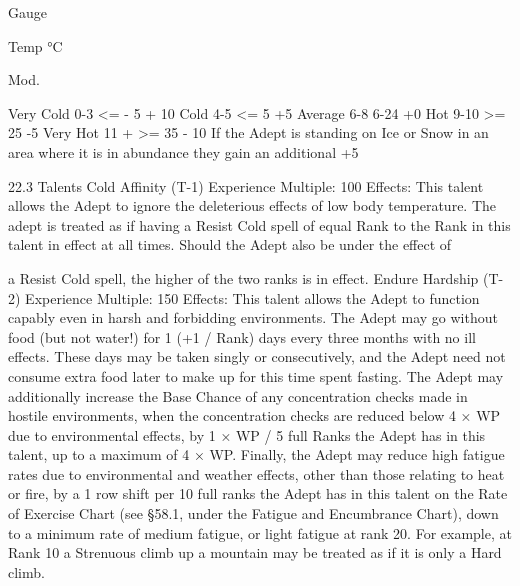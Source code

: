 \documentclass[a4paper]{article}
\begin{document}
\begin{multicols}{3}
Gauge

Temp °C

Mod.

Very Cold 0-3
<= - 5
+ 10
Cold
4-5
<= 5
+5
Average
6-8
6-24
+0
Hot
9-10
>= 25
-5
Very Hot
11 +
>= 35
- 10
If the Adept is standing on Ice or Snow in an area
where it is in abundance they gain an additional
+5%

22.3 Talents
Cold Affinity (T-1)
Experience Multiple: 100
Effects: This talent allows the Adept to ignore the
deleterious effects of low body temperature. The
adept is treated as if having a Resist Cold spell of
equal Rank to the Rank in this talent in effect at all
times. Should the Adept also be under the effect of

a Resist Cold spell, the higher of the two ranks is in
effect.
Endure Hardship (T-2)
Experience Multiple: 150
Effects: This talent allows the Adept to function
capably even in harsh and forbidding environments. The Adept may go without food (but not
water!) for 1 (+1 / Rank) days every three months
with no ill effects. These days may be taken singly
or consecutively, and the Adept need not consume
extra food later to make up for this time spent
fasting. The Adept may additionally increase the
Base Chance of any concentration checks made in
hostile environments, when the concentration
checks are reduced below 4 × WP due to environmental effects, by 1 × WP / 5 full Ranks the Adept
has in this talent, up to a maximum of 4 × WP.
Finally, the Adept may reduce high fatigue rates
due to environmental and weather effects, other
than those relating to heat or fire, by a 1 row shift
per 10 full ranks the Adept has in this talent on the
Rate of Exercise Chart (see §58.1, under the Fatigue and Encumbrance Chart), down to a minimum rate of medium fatigue, or light fatigue at
rank 20. For example, at Rank 10 a Strenuous
climb up a mountain may be treated as if it is only
a Hard climb.


\end{multicols}
\end{document}
